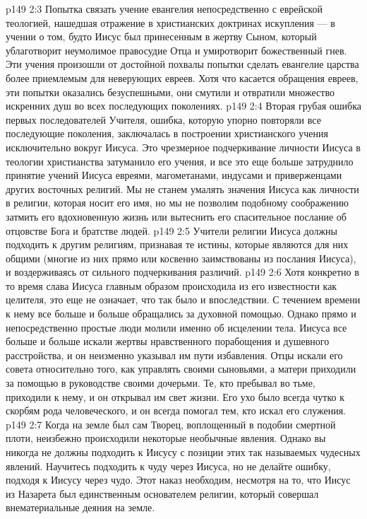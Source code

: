 \vs p149 2:3 \bibnobreakspace Попытка связать учение евангелия непосредственно с еврейской теологией, нашедшая отражение в христианских доктринах искупления --- в учении о том, будто Иисус был принесенным в жертву Сыном, который ублаготворит неумолимое правосудие Отца и умиротворит божественный гнев. Эти учения произошли от достойной похвалы попытки сделать евангелие царства более приемлемым для неверующих евреев. Хотя что касается обращения евреев, эти попытки оказались безуспешными, они смутили и отвратили множество искренних душ во всех последующих поколениях.
\vs p149 2:4 \bibnobreakspace Вторая грубая ошибка первых последователей Учителя, ошибка, которую упорно повторяли все последующие поколения, заключалась в построении христианского учения исключительно вокруг  Иисуса. Это чрезмерное подчеркивание личности Иисуса в теологии христианства затуманило его учения, и все это еще больше затруднило принятие учений Иисуса евреями, магометанами, индусами и приверженцами других восточных религий. Мы не станем умалять значения Иисуса как личности в религии, которая носит его имя, но мы не позволим подобному соображению затмить его вдохновенную жизнь или вытеснить его спасительное послание об отцовстве Бога и братстве людей.
\vs p149 2:5 \pc Учители религии Иисуса должны подходить к другим религиям, признавая те истины, которые являются для них общими (многие из них прямо или косвенно заимствованы из послания Иисуса), и воздерживаясь от сильного подчеркивания различий.
\vs p149 2:6 \pc Хотя конкретно в то время слава Иисуса главным образом происходила из его известности как целителя, это еще не означает, что так было и впоследствии. С течением времени к нему все больше и больше обращались за духовной помощью. Однако прямо и непосредственно простые люди молили именно об исцелении тела. Иисуса все больше и больше искали жертвы нравственного порабощения и душевного расстройства, и он неизменно указывал им пути избавления. Отцы искали его совета относительно того, как управлять своими сыновьями, а матери приходили за помощью в руководстве своими дочерьми. Те, кто пребывал во тьме, приходили к нему, и он открывал им свет жизни. Его ухо было всегда чутко к скорбям рода человеческого, и он всегда помогал тем, кто искал его служения.
\vs p149 2:7 Когда на земле был сам Творец, воплощенный в подобии смертной плоти, неизбежно происходили некоторые необычные явления. Однако вы никогда не должны подходить к Иисусу с позиции этих так называемых чудесных явлений. Научитесь подходить к чуду через Иисуса, но не делайте ошибку, подходя к Иисусу через чудо. Этот наказ необходим, несмотря на то, что Иисус из Назарета был единственным основателем религии, который совершал внематериальные деяния на земле.
